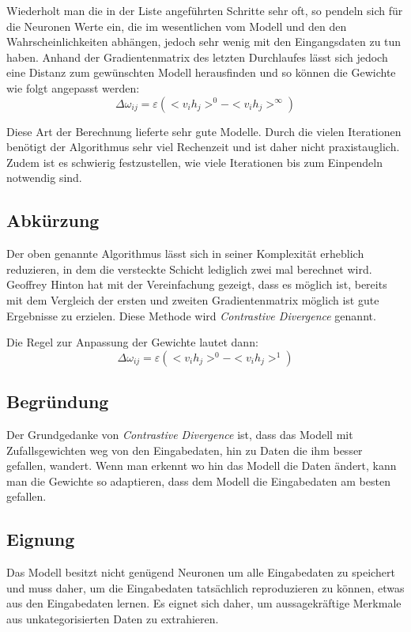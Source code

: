 Wiederholt man die in der Liste angeführten Schritte sehr oft, so pendeln sich für die Neuronen Werte ein, die im wesentlichen vom Modell und den den Wahrscheinlichkeiten abhängen, jedoch sehr wenig mit den Eingangsdaten zu tun haben. Anhand der Gradientenmatrix des letzten Durchlaufes lässt sich jedoch eine Distanz zum gewünschten Modell herausfinden und so können die Gewichte wie folgt angepasst werden:
$$\Delta\omega_{ij} = \varepsilon (<v_ih_j>^0 -  <v_ih_j>^\infty)$$

Diese Art der Berechnung lieferte sehr gute Modelle. Durch die vielen Iterationen benötigt der Algorithmus sehr viel Rechenzeit und ist daher nicht praxistauglich. Zudem ist es schwierig festzustellen, wie viele Iterationen bis zum Einpendeln notwendig sind.

\subsection{Abkürzung}

Der oben genannte Algorithmus lässt sich in seiner Komplexität erheblich reduzieren, in dem die versteckte Schicht lediglich zwei mal berechnet wird. Geoffrey Hinton hat mit der Vereinfachung gezeigt, dass es möglich ist, bereits mit dem Vergleich der ersten und zweiten Gradientenmatrix möglich ist gute Ergebnisse zu erzielen. Diese Methode wird \emph{Contrastive Divergence} genannt.

Die Regel zur Anpassung der Gewichte lautet dann:
$$\Delta\omega_{ij} = \varepsilon (<v_ih_j>^0 -  <v_ih_j>^1)$$

\subsection{Begründung}

Der Grundgedanke von \emph{Contrastive Divergence} ist, dass das Modell mit Zufallsgewichten weg von den Eingabedaten, hin zu Daten die ihm besser gefallen, wandert. Wenn man erkennt wo hin das Modell die Daten ändert, kann man die Gewichte so adaptieren, dass dem Modell die Eingabedaten am besten gefallen.

\subsection{Eignung}

Das Modell besitzt nicht genügend Neuronen um alle Eingabedaten zu speichert und muss daher, um die Eingabedaten tatsächlich reproduzieren zu können, etwas aus den Eingabedaten lernen. Es eignet sich daher, um aussagekräftige Merkmale aus unkategorisierten Daten zu extrahieren.


